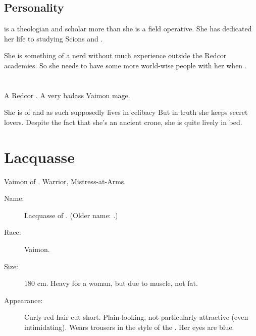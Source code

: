 \subsection{Personality}
\Esmerel{} is a theologian and scholar more than she is a field operative. 
She has dedicated her life to studying Scions and \Malachim. 

She is something of a nerd without much experience outside the Redcor academies. 
So she needs to have some more world-wise people with her when \travelling. 















\section{\Dominice}
A Redcor \Matriarch. A very badass Vaimon mage. 

She is of \theTulipFaction{} and as such supposedly lives in celibacy
But in truth she keeps secret lovers. 
Despite the fact that she's an ancient crone, she is quite lively in bed.















\section{\Laetitia Lacquasse}
Vaimon of \ClanRedcor. Warrior, Mistress-at-Arms. 

\begin{description}
  \item[Name:] 
    \Ryzin{} \Laetitia{} Lacquasse of \ClanRedcor. 
    (Older name: \Brizen{}.)
  \item[Race:] Vaimon. 
  \item[Size:] 180 cm. Heavy for a woman, but due to muscle, not fat. 
  \item[Appearance:] Curly red hair cut short. Plain-looking, not particularly attractive (even intimidating). Wears trousers in the style of the \Ryzin. Her eyes are blue. 
\end{description}















